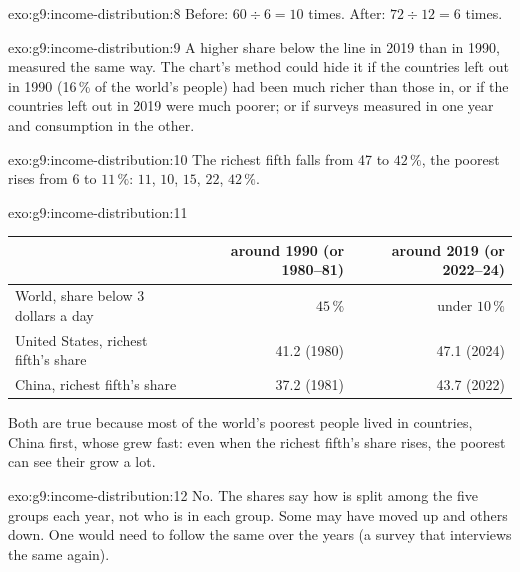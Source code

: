 \begin{solution}{exo:g9:income-distribution:8}
Before: $60 \div 6 = 10$ times. After: $72 \div 12 = 6$ times.
\end{solution}

\begin{solution}{exo:g9:income-distribution:9}
A higher share below the line in 2019 than in 1990, measured the same way. The chart's method could hide it
if the countries left out in 1990 (16\,\% of the world's people) had been much richer than those in, or if
the countries left out in 2019 were much poorer; or if surveys measured  in one year and consumption
in the other.
\end{solution}

\begin{solution}{exo:g9:income-distribution:10}
The richest fifth falls from 47 to $42\,\%$, the poorest rises from 6 to $11\,\%$: $11$, $10$, $15$, $22$,
$42\,\%$.
\end{solution}

\begin{solution}{exo:g9:income-distribution:11}
\begin{center}\small
\begin{tabular}{lrr}
\toprule
 & around 1990 (or 1980--81) & around 2019 (or 2022--24) \\
\midrule
World, share below 3 dollars a day & $45\,\%$ & under $10\,\%$ \\
United States, richest fifth's share & 41.2 (1980) & 47.1 (2024) \\
China, richest fifth's share & 37.2 (1981) & 43.7 (2022) \\
\bottomrule
\end{tabular}
\end{center}
Both are true because most of the world's poorest people lived in countries, China first, whose  grew
fast: even when the richest fifth's share rises, the poorest can see their  grow a lot.
\end{solution}

\begin{solution}{exo:g9:income-distribution:12}
No. The shares say how  is split among the five groups each year, not who is in each group. Some
 may have moved up and others down. One would need to follow the same  over the years
(a survey that interviews the same  again).
\end{solution}

